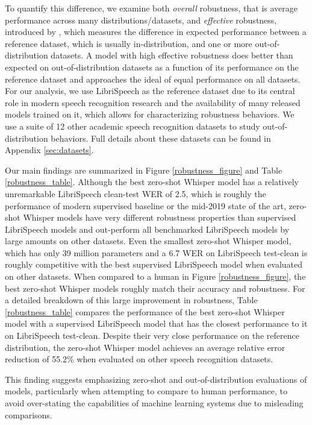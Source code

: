 \documentclass[nohyperref]{article}
\theoremstyle{plain}
\theoremstyle{definition}
\theoremstyle{remark}
\begin{document}
To quantify this difference, we examine both \textit{overall} robustness, that is average performance across many distributions/datasets, and \textit{effective} robustness, introduced by \citet{taori2020robustness}, which measures the difference in expected performance between a reference dataset, which is usually in-distribution, and one or more out-of-distribution datasets. A model with high effective robustness does better than expected on out-of-distribution datasets as a function of its performance on the reference dataset and approaches the ideal of equal performance on all datasets. For our analysis, we use LibriSpeech as the reference dataset due to its central role in modern speech recognition research and the availability of many released models trained on it, which allows for characterizing robustness behaviors. We use a suite of 12 other academic speech recognition datasets to study out-of-distribution behaviors. Full details about these datasets can be found in Appendix \ref{sec:datasets}.

Our main findings are summarized in Figure \ref{robustness_figure} and Table \ref{robustness_table}. Although the best zero-shot Whisper model has a relatively unremarkable LibriSpeech clean-test WER of 2.5, which is roughly the performance of modern supervised baseline or the mid-2019 state of the art, zero-shot Whisper models have very different robustness properties than supervised LibriSpeech models and out-perform all benchmarked LibriSpeech models by large amounts on other datasets. Even the smallest zero-shot Whisper model, which has only 39 million parameters and a 6.7 WER on LibriSpeech test-clean is roughly competitive with the best supervised LibriSpeech model when evaluated on other datasets. When compared to a human in Figure \ref{robustness_figure}, the best zero-shot Whisper models roughly match their accuracy and robustness. For a detailed breakdown of this large improvement in robustness, Table \ref{robustness_table} compares the performance of the best zero-shot Whisper model with a supervised LibriSpeech model that has the closest performance to it on LibriSpeech test-clean. Despite their very close performance on the reference distribution, the zero-shot Whisper model achieves an average relative error reduction of 55.2\% when evaluated on other speech recognition datasets. 

This finding suggests emphasizing zero-shot and out-of-distribution evaluations of models, particularly when attempting to compare to human performance, to avoid over-stating the capabilities of machine learning systems due to misleading comparisons.
\end{document}
